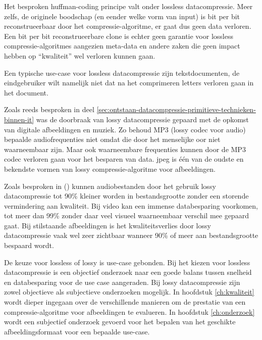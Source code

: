 Het besproken \gls{huffman-coding} principe valt onder \gls{lossless} \gls{datacompressie}. Meer zelfs, de originele boodschap (en eender welke vorm van input) is bit per bit reconstrueerbaar door het \gls{compressie-algoritme}, er gaat dus geen data verloren. Een bit per bit reconstrueerbare clone is echter geen garantie voor \gls{lossless} \glspl{compressie-algoritme} aangezien \gls{meta-data} en andere zaken die geen impact hebben op “kwaliteit” wel verloren kunnen gaan.

Een typische \gls{use-case} voor \gls{lossless} \gls{datacompressie} zijn tekstdocumenten, de eindgebruiker wilt namelijk niet dat na het comprimeren letters verloren gaan in het document. 

Zoals reeds besproken in deel \ref{sec:ontstaan-datacompressie-primitieve-technieken-binnen-it} was de doorbraak van  \gls{lossy} \gls{datacompressie} gepaard met de opkomst van digitale afbeeldingen en muziek. Zo behoud MP3 (\gls{lossy} \gls{codec} voor audio) bepaalde audiofrequenties niet omdat die door het menselijke oor niet waarneembaar zijn. Maar ook waarneembare frequenties kunnen door de MP3 \gls{codec} verloren gaan voor het besparen van data. \gls{jpeg} is één van de oudste en bekendste vormen van \gls{lossy} \gls{compressie-algoritme} voor afbeeldingen. 

Zoals besproken in  (\cite{kaur2016}) kunnen audiobestanden door het gebruik \gls{lossy} \gls{datacompressie} tot 90\% kleiner worden in bestandsgrootte zonder een storende vermindering aan kwaliteit. Bij video kan een immense databesparing voorkomen, tot meer dan 99\% zonder daar veel visueel waarneembaar verschil mee gepaard gaat. Bij stilstaande afbeeldingen is het kwaliteitsverlies door \gls{lossy} \gls{datacompressie} vaak wel zeer zichtbaar wanneer 90\% of meer aan bestandsgrootte bespaard wordt.

De keuze voor \gls{lossless} of \gls{lossy} is \gls{use-case} gebonden. Bij het kiezen voor \gls{lossless} \gls{datacompressie} is een objectief onderzoek naar een goede balans tussen snelheid en databesparing voor de use case aangeraden. Bij \gls{lossy} \gls{datacompressie} zijn zowel objectieve als subjectieve onderzoeken mogelijk. In hoofdstuk \ref{ch:kwaliteit} wordt dieper ingegaan over de verschillende manieren om de prestatie van een \gls{compressie-algoritme} voor afbeeldingen te evalueren. In hoofdstuk \ref{ch:onderzoek} wordt een subjectief onderzoek gevoerd voor het bepalen van het geschikte \gls{afbeeldingsformaat} voor een bepaalde \gls{use-case}.

